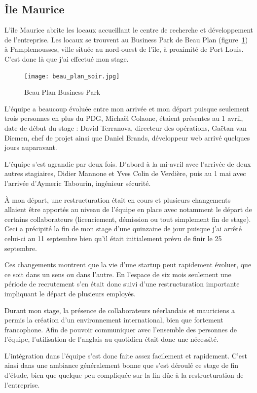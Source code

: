 \documentclass[a4paper,10pt, twoside]{report}
\begin{document}
\begin{spacing}{1.2}
\section{Île Maurice}

L'île Maurice abrite les locaux accueillant le centre de recherche et
développement de l'entreprise. Les locaux se trouvent au Business Park de
Beau Plan (figure~\ref{beauPlan}) à Pamplemousses, ville située au
nord-ouest de l'île, à proximité de Port Louis. C'est donc là que
j'ai effectué mon stage.

\begin{figure}[h!]
  \centering
  \texttt{[image: beau\_plan\_soir.jpg]}
  \caption{\label{beauPlan} Beau Plan Business Park}
\end{figure}

L'équipe a beaucoup évoluée entre mon arrivée et mon départ puisque
seulement trois personnes en plus du PDG, Michaël Colaone, étaient
présentes au 1 avril, date de début du stage : David Terranova,
directeur des opérations, Gaëtan van Diemen, chef de projet ainsi que
Daniel Brands, développeur web arrivé quelques jours auparavant.

L'équipe s'est agrandie par deux fois. D'abord à la mi-avril avec
l'arrivée de deux autres stagiaires, Didier Mannone et
Yves Colin de Verdière, puis au 1 mai avec l'arrivée d'Aymeric
Tabourin, ingénieur sécurité.

À mon départ, une restructuration était en cours et plusieurs changements
allaient être apportés au niveau de l'équipe en place avec notamment le
départ de certains collaborateurs (licenciement, démission ou tout
simplement fin de stage). Ceci a précipité la fin de mon stage d'une
quinzaine de jour puisque j'ai arrêté celui-ci au 11 septembre bien qu'il
était initialement prévu de finir le 25 septembre.

Ces changements montrent que la vie d'une startup peut rapidement évoluer,
que ce soit dans un sens ou dans l'autre. En l'espace de six mois seulement
une période de recrutement s'en était donc suivi d'une restructuration
importante impliquant le départ de plusieurs employés.

Durant mon stage, la présence de collaborateurs
néerlandais et mauriciens a permis la création d'un environnement
international, bien que fortement francophone. Afin de pouvoir communiquer avec
l'ensemble des personnes de l'équipe, l'utilisation de l'anglais au quotidien
était donc une nécessité.

L'intégration dans l'équipe s'est donc faite assez facilement et rapidement.
C'est ainsi dans une ambiance généralement bonne que s'est
déroulé ce stage de fin d'étude, bien que quelque peu
compliquée sur la fin dûe à la restructuration de l'entreprise.


\end{spacing}
\end{document}
